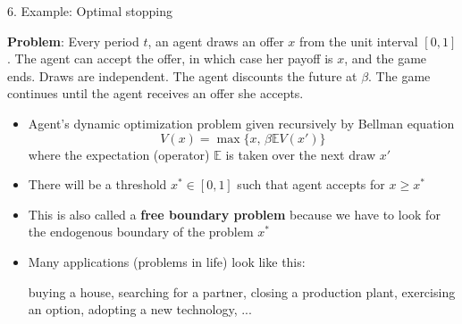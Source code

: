 \documentclass[10pt]{beamer}
\begin{document}
\begin{frame}{6. Example: Optimal stopping}

\vspace{5mm}
\textbf{Problem}: Every period $t$, an agent draws an offer $x$ from the unit interval $[0, 1]$. The agent can accept the offer, in which case her payoff is $x$, and the game ends. Draws are independent. The agent discounts the future at $\beta$. The game continues until the agent receives an offer she accepts.

\vspace{5mm}
\begin{itemize}
\item Agent's dynamic optimization problem given recursively by Bellman equation 
\begin{equation*}
	V(x) = \max \Big\{ x, \, \beta \mathbb{E} V(x') \Big\}
\end{equation*}
where the expectation (operator) $\mathbb{E}$ is taken over the next draw $x'$

\item There will be a threshold $x^* \in [0, 1]$ such that agent accepts for $x \geq x^*$

\item This is also called a \textbf{free boundary problem} because we have to look for the endogenous boundary of the problem $x^*$

\item Many applications (problems in life) look like this: 

buying a house, searching for a partner, closing a production plant, exercising an option, adopting a new technology, ... 

\end{itemize}

\end{frame}
\end{document}
